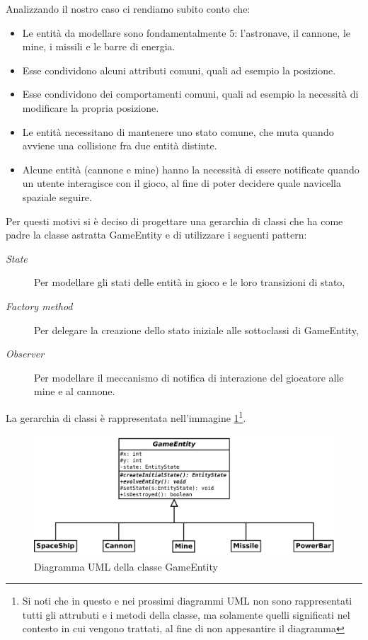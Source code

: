 \documentclass[a4paper,12pt]{article}
\begin{document}
Analizzando il nostro caso ci rendiamo subito conto che:
\begin{itemize}
\item Le entit\`a da modellare sono fondamentalmente 5: l'astronave, il cannone, le mine, i missili e le barre di energia.
\item Esse condividono alcuni attributi comuni, quali ad esempio la posizione.
\item Esse condividono dei comportamenti comuni, quali ad esempio la necessit\`a di modificare la propria posizione.
\item Le entit\`a necessitano di mantenere uno stato comune, che muta quando avviene una collisione fra due entit\`a distinte.
\item Alcune entit\`a (cannone e mine) hanno la necessit\`a di essere notificate quando un utente interagisce con il gioco, al fine di poter decidere quale navicella spaziale seguire.
\end{itemize}

Per questi motivi si \`e deciso di progettare una gerarchia di classi che ha come padre la classe astratta \textsf{GameEntity} e di utilizzare i seguenti pattern:
\begin{description}
\item[\emph{State}] Per modellare gli stati delle entit\`a in gioco e le loro transizioni di stato,
\item[\emph{Factory method}] Per delegare la creazione dello stato iniziale alle sottoclassi di \textsf{GameEntity},
\item[\emph{Observer}] Per modellare il meccanismo di notifica di interazione del giocatore alle mine e al cannone.
\end{description}

La gerarchia di classi \`e rappresentata nell'immagine \ref{img:GameEntity}\footnote{Si noti che in questo e nei prossimi diagrammi UML non sono rappresentati tutti gli attrubuti e i metodi della classe, ma solamente quelli significati nel contesto in cui vengono trattati, al fine di non appesantire il diagramma}.

\begin{figure}[ht]
\centering
\includegraphics[width=15cm]{GameEntity.pdf}
\caption{Diagramma UML della classe \textsf{GameEntity}}
\label{img:GameEntity}
\end{figure}
\end{document}
